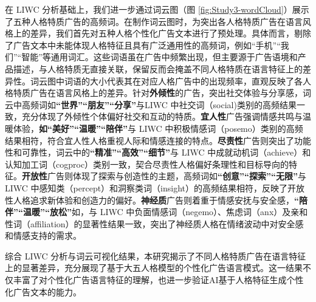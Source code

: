 在 LIWC 分析基础上，我们进一步通过词云图（图 \ref{fig:Study3-wordCloud}）展示了五种人格特质广告的高频词。在制作词云图时，为突出各人格特质广告在语言风格上的差异，我们首先对五种人格个性化广告文本进行了预处理。具体而言，剔除了广告文本中未能体现人格特征且具有广泛通用性的高频词，例如“手机”“我们”“智能”等通用词汇。这些词语虽在广告中频繁出现，但主要源于广告语境和产品描述，与人格特质无直接关联，保留反而会掩盖不同人格特质在语言特征上的差异性。词云图中词语的大小代表其在对应人格广告中的出现频率，直观反映了各人格特质广告在语言风格上的差异。针对\textbf{外倾性}的广告，突出社交体验与分享感，词云中高频词如\textbf{“世界”“朋友”“分享”}与LIWC 中社交词（social)类别的高频结果一致，充分体现了外倾性个体偏好社交和互动的特质。\textbf{宜人性}广告强调情感共鸣与温暖体验，\textbf{如“美好”“温暖”“陪伴”}与 LIWC 中积极情感词（posemo）类别的高频结果相符，符合宜人性人格重视人际和情感连接的特点。\textbf{尽责性}广告则突出了功能性和可靠性，词云中的\textbf{“精准”“高效”“细节”}与 LIWC 中成就动机词（achieve）和认知加工词（cogproc）类别一致，契合尽责性人格偏好条理性和目标导向的特征。\textbf{开放性}广告则体现了探索与创造性的主题，高频词如\textbf{“创意”“探索”“无限”}与 LIWC 中感知类（percept）和洞察类词（insight）的高频结果相符，反映了开放性人格追求新体验和创造力的偏好。\textbf{神经质}广告则着重于情感安抚与安全感，\textbf{“陪伴”“温暖”“放松”}如，与 LIWC 中负面情感词（negemo）、焦虑词（anx）及亲和性词（affiliation）的显著性结果一致，突出了神经质人格在情绪波动中对安全感和情感支持的需求。

综合 LIWC 分析与词云可视化结果，本研究揭示了不同人格特质广告在语言特征上的显著差异，充分展现了基于大五人格模型的个性化广告语言模式。这一结果不仅丰富了对个性化广告语言特征的理解，也进一步验证AI基于人格特征生成个性化广告文本的能力。

